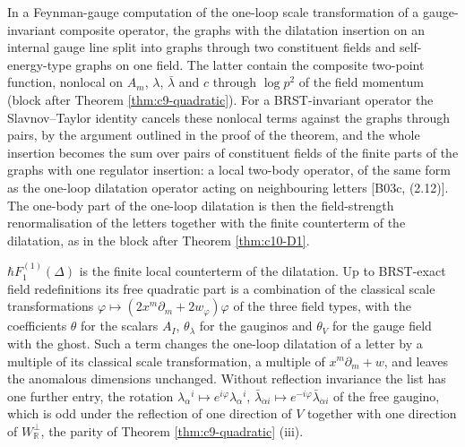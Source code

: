 \begin{remark}
In a Feynman-gauge computation of the one-loop scale transformation of a gauge-invariant composite operator, the graphs with the dilatation insertion on an internal gauge line split into graphs through two constituent fields and self-energy-type graphs on one field. The latter contain the composite two-point function, nonlocal on $A_m$, $\lambda$, $\bar\lambda$ and $c$ through $\log p^2$ of the field momentum (block after Theorem \ref{thm:c9-quadratic}). For a BRST-invariant operator the Slavnov--Taylor identity cancels these nonlocal terms against the graphs through pairs, by the argument outlined in the proof of the theorem, and the whole insertion becomes the sum over pairs of constituent fields of the finite parts of the graphs with one regulator insertion: a local two-body operator, of the same form as the one-loop dilatation operator acting on neighbouring letters [B03c, (2.12)]. The one-body part of the one-loop dilatation is then the field-strength renormalisation of the letters together with the finite counterterm of the dilatation, as in the block after Theorem \ref{thm:c10-D1}.
\end{remark}

\begin{remark}
$\hbar F_1^{(1)}(\Delta)$ is the finite local counterterm of the dilatation. Up to BRST-exact field redefinitions its free quadratic part is a combination of the classical scale transformations $\varphi\mapsto(2x^m\partial_m+2w_\varphi)\varphi$ of the three field types, with the coefficients $\theta$ for the scalars $A_I$, $\theta_\lambda$ for the gauginos and $\theta_V$ for the gauge field with the ghost. Such a term changes the one-loop dilatation of a letter by a multiple of its classical scale transformation, a multiple of $x^m\partial_m+w$, and leaves the anomalous dimensions unchanged. Without reflection invariance the list has one further entry, the rotation $\lambda_\alpha{}^i\mapsto e^{i\varphi}\lambda_\alpha{}^i$, $\bar\lambda_{\dot\alpha i}\mapsto e^{-i\varphi}\bar\lambda_{\dot\alpha i}$ of the free gaugino, which is odd under the reflection of one direction of $V$ together with one direction of $W_{\mathbb R}^\perp$, the parity of Theorem \ref{thm:c9-quadratic} (iii).
\end{remark}

